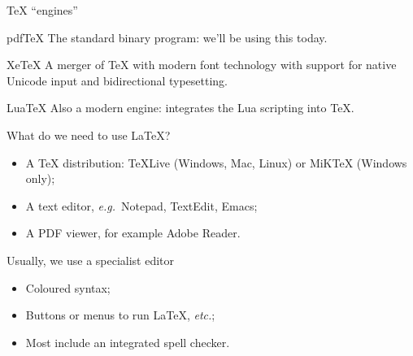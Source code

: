 \begin{frame}{\TeX{} \enquote{engines}}

  \begin{block}{pdf\TeX}
    The standard binary program: we'll be using this today.
  \end{block}
  
  \begin{block}{Xe\TeX}
    A merger of \TeX{} with modern font technology with support
    for native Unicode input and bidirectional typesetting.
  \end{block}
  
  \begin{block}{Lua\TeX}
    Also a modern engine: integrates the Lua scripting into \TeX.
  \end{block}
  
\end{frame}

\begin{frame}{What do we need to use \LaTeX?}

  \begin{itemize}
    \item A \TeX{} distribution: \TeX{}Live (Windows, Mac, Linux) or
      MiK\TeX{} (Windows only);
    \item A text editor, \emph{e.g.}~Notepad, TextEdit, Emacs;
    \item A PDF viewer, for example Adobe Reader.
  \end{itemize}

  \pause
  
  Usually, we use a specialist editor
  \begin{itemize}
    \item Coloured syntax;
    \item Buttons or menus to run \LaTeX{}, \emph{etc.};
    \item Most include an integrated spell checker.
  \end{itemize}
\end{frame}

